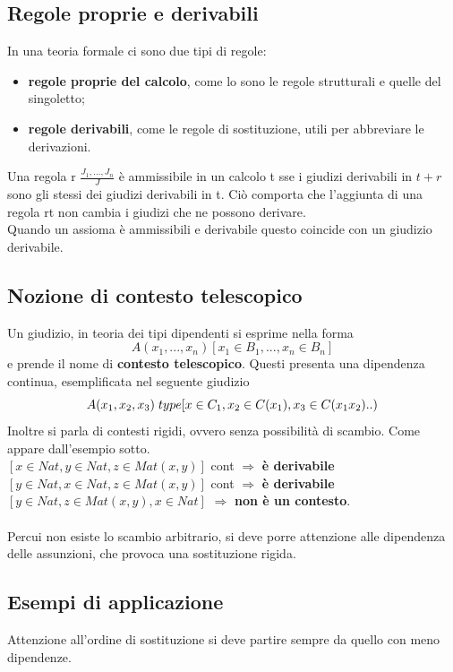 \documentclass[10pt,a4paper, italian]{book}
\begin{document}
{{{\subsection{Regole proprie e derivabili}
\label{subsec:regole-proprie-derivabili}
In una teoria formale ci sono due tipi di regole:
\begin{itemize}
\item \textbf{regole proprie del calcolo}, come lo sono le regole strutturali e quelle del singoletto;
\item \textbf{regole derivabili}, come le regole di sostituzione, utili per abbreviare le derivazioni.
\end{itemize}
\noindent
Una regola r $\frac{J_1,...,J_n}{J}$ \`e ammissibile in un calcolo t sse i giudizi derivabili in $t+r$ sono gli stessi dei giudizi derivabili in t. Ci\`o comporta che l'aggiunta di una regola rt non cambia i giudizi che ne possono derivare.\\ Quando un assioma \`e ammissibili e derivabile questo coincide con un giudizio derivabile.

\subsection{Nozione di contesto telescopico}
\label{subsec:contesto-telescopico}
Un giudizio, in teoria dei tipi dipendenti si esprime nella forma
\[A(x_1,...,x_n)[x_1 \in B_1,...,x_n \in B_n]\]
e prende il nome di \textbf{contesto telescopico}.
Questi presenta una dipendenza continua, esemplificata nel seguente giudizio
\[A(x_1,x_2,x_3)\hspace{0.1cm}type[x \in C_1, x_2 \in C(x_1), x_3 \in C(x_1 x_2)..)\]
Inoltre si parla di contesti rigidi, ovvero senza possibilit\`a di scambio. Come appare dall'esempio sotto. \\
$[x \in Nat, y \in Nat, z \in Mat(x,y)]$ cont  $\Rightarrow$ \textbf{\`e derivabile}\\
$[y \in Nat, x \in Nat, z \in Mat(x,y)]$ cont $\Rightarrow$ \textbf{\`e derivabile}\\
$[y \in Nat, z \in Mat(x,y), x \in Nat]$ $\Rightarrow$ \textbf{non \`e un contesto}. \\\\ Percui non esiste lo scambio arbitrario, si deve porre attenzione alle dipendenza delle assunzioni, che provoca una sostituzione rigida.
\subsection{Esempi di applicazione}
\label{subsec:esempi-di-applicazione}
Attenzione all'ordine di sostituzione si deve partire sempre da quello con meno dipendenze.
\begin{prooftree}
\end{prooftree}

}}}
\end{document}
